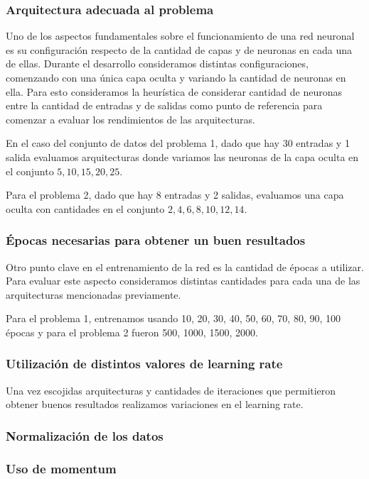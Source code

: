 \documentclass[informe.tex]{subfiles}
\begin{document}
    \subsubsection{Arquitectura adecuada al problema}
      Uno de los aspectos fundamentales sobre el funcionamiento de una red neuronal es su configuraci\'on respecto de la cantidad de capas y de neuronas en cada una de ellas. Durante el desarrollo consideramos distintas configuraciones, comenzando con una \'unica capa oculta y variando la cantidad de neuronas en ella. Para esto consideramos la heurística de considerar cantidad de neuronas entre la cantidad de entradas y de salidas\cite{nnwithJava} como punto de referencia para comenzar a evaluar los rendimientos de las arquitecturas.
      
      En el caso del conjunto de datos del problema 1, dado que hay 30 entradas y 1 salida evaluamos arquitecturas donde variamos las neuronas de la capa oculta en el conjunto ${5,10,15,20,25}$. 
      
      Para el problema 2, dado que hay 8 entradas y 2 salidas, evaluamos una capa oculta con cantidades en el conjunto ${2,4,6,8,10,12,14}$.
    
    
    \subsubsection{\'Epocas necesarias para obtener un buen resultados}
      Otro punto clave en el entrenamiento de la red es la cantidad de \'epocas a utilizar. Para evaluar este aspecto consideramos distintas cantidades para cada una de las arquitecturas mencionadas previamente.
      
      Para el problema 1, entrenamos usando 10, 20, 30, 40, 50, 60, 70, 80, 90, 100 \'epocas y para el problema 2 fueron 500, 1000, 1500, 2000.
    
    
    \subsubsection{Utilizaci\'on de distintos valores de learning rate}
      Una vez escojidas arquitecturas y cantidades de iteraciones que permitieron obtener buenos resultados realizamos variaciones en el learning rate.
    
    \subsubsection{Normalización de los datos}
    
    \subsubsection{Uso de momentum}
  
\end{document}
